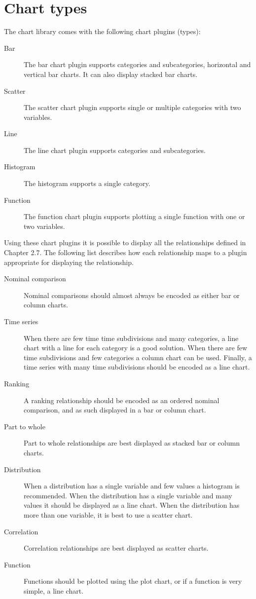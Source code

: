 \chapter{Chart types}
The chart library comes with the following chart plugins (types):
\begin{description}
\item[Bar] The bar chart plugin supports categories and subcategories, horizontal and vertical bar charts. It can also display stacked bar charts.
\item[Scatter] The scatter chart plugin supports single or multiple categories with two variables.
\item[Line] The line chart plugin supports categories and subcategories.
\item[Histogram] The histogram supports a single category.
\item[Function] The function chart plugin supports plotting a single function with one or two variables.
\end{description}

Using these chart plugins it is possible to display all the relationships defined in Chapter 2.7. The following list describes how each relationship maps to a plugin appropriate for displaying the relationship.

\begin{description}
\item[Nominal comparison] Nominal comparisons should almost always be encoded as either bar or column charts.
\item[Time series] When there are few time time subdivisions and many categories, a line chart with a line for each category is a good solution. When there are few time subdivisions and few categories a column chart can be used. Finally, a time series with many time subdivisions should be encoded as a line chart.
\item[Ranking] A ranking relationship should be encoded as an ordered nominal comparison, and as such displayed in a bar or column chart.
\item[Part to whole] Part to whole relationships are best displayed as stacked bar or column charts.
\item[Distribution] When a distribution has a single variable and few values a histogram is recommended. When the distribution has a single variable and many values it should be displayed as a line chart. When the distribution has more than one variable, it is best to use a scatter chart.
\item[Correlation] Correlation relationships are best displayed as scatter charts.
\item[Function] Functions should be plotted using the plot chart, or if a function is very simple, a line chart.
\end{description}

